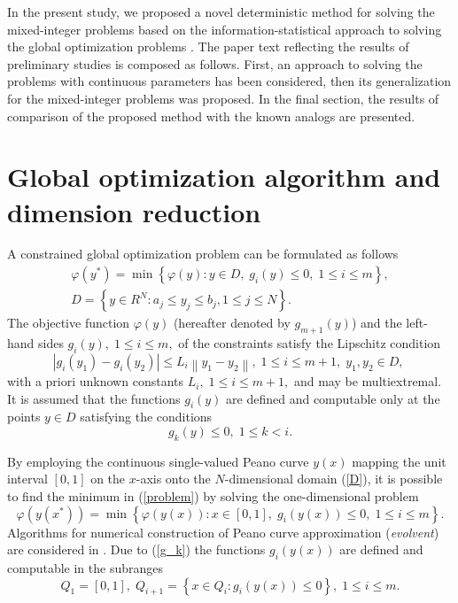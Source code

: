 \documentclass{llncs}
\begin{document}
In the present study, we proposed a novel deterministic method for solving the mixed-integer 
problems based on the information-statistical approach to solving the global optimization 
problems \cite{Strongin2000,Strongin2013}. The paper text reflecting the results of preliminary 
studies is composed as follows. First, an approach to solving the problems with continuous 
parameters has been considered, then its generalization for the mixed-integer problems was 
proposed. In the final section, the results of comparison of the proposed method with the 
known analogs are presented.

\section{Global optimization algorithm and dimension reduction}

A constrained global optimization problem can be formulated as follows
\begin{gather}\label{problem}
\varphi(y^\ast)=\min{\left\{\varphi(y):y\in D, \; g_i(y)\leq 0, \; 1 \leq i \leq m\right\}},\\
D=\left\{y\in R^N: a_j\leq y_j \leq b_j, 1\leq j \leq N \right\}.\label{D}
\end{gather}
The objective function $\varphi(y)$ (hereafter denoted by $g_{m+1}(y)$) and the left-hand 
sides $g_i(y), \; 1\leq i \leq m,$ of the constraints satisfy the Lipschitz condition 
\[
\left|g_i(y_1)-g_i(y_2)\right|\leq L_i\left\|y_1-y_2\right\|, \;1\leq i\leq m+1, \; y_1,y_2 \in D,\;
\]
with a priori unknown constants $L_i, \; 1 \leq i \leq m+1,$ and may be multiextremal. It is 
assumed that the functions $g_i(y)$ are defined and computable only at the points $y \in D$ 
satisfying the conditions
\begin{equation}\label{g_k}
g_k(y) \leq 0, \; 1 \leq k < i.
\end{equation}

By employing the continuous single-valued Peano curve $y(x)$ mapping the unit interval 
$[0,1]$ on the $x$-axis onto the $N$-dimensional domain (\ref{D}), it is possible to find the 
minimum in (\ref{problem}) by solving the one-dimensional problem
\[
\varphi(y(x^\ast))=\min \left\{\varphi(y(x)): x \in [0,1], \; g_i(y(x))\leq 0, \; 1 \leq i \leq m\right\}.
\]
Algorithms for numerical construction of Peano curve approximation (\textit{evolvent}) are 
considered in \cite{Strongin2013}. Due to (\ref{g_k}) the functions $g_i(y(x))$ are defined 
and computable in the subranges 
\[
Q_1=[0,1], \; Q_{i+1}=\left\{x \in Q_i : g_i(y(x)) \leq 0 \right\}, \; 1 \leq i \leq m.
\]
\end{document}
